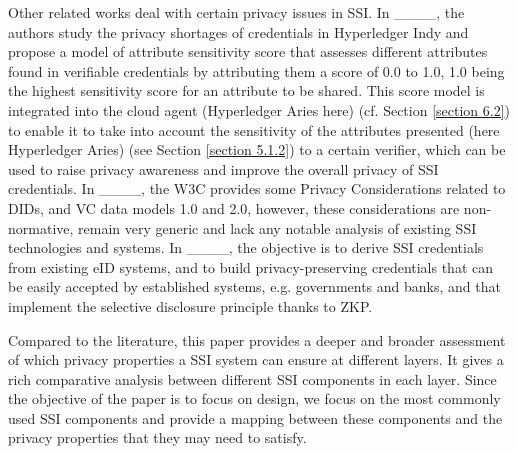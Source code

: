 Other related works deal with certain privacy issues in SSI. In ____, the authors study the privacy shortages of credentials in Hyperledger Indy and propose a model of attribute sensitivity score that assesses different attributes found in verifiable credentials by attributing them a score of 0.0 to 1.0, 1.0 being the highest sensitivity score for an attribute to be shared. This score model is integrated into the cloud agent (Hyperledger Aries here) (cf. Section \ref{section 6.2}) to enable it to take into account the sensitivity of the attributes presented (here Hyperledger Aries) (see Section \ref{section 5.1.2}) to a certain verifier, which can be used to raise privacy awareness and improve the overall privacy of SSI credentials. 
In ____, the W3C provides some Privacy Considerations related to DIDs, and VC data models 1.0 and 2.0, however, these considerations are non-normative, remain very generic and lack any notable analysis of existing SSI technologies and systems.
In ____, the objective is to derive SSI credentials from existing eID systems, and to build privacy-preserving credentials that can be easily accepted by established systems, e.g. governments and banks, and that implement the selective disclosure principle thanks to ZKP.



Compared to the literature, this paper provides a deeper and broader assessment of which privacy properties a SSI system can ensure at different layers. It gives a rich comparative analysis between different SSI components in each layer. Since the objective of the paper is to focus on design, we focus on the most commonly used SSI components and provide a mapping between these components and the privacy properties that they may need to satisfy.